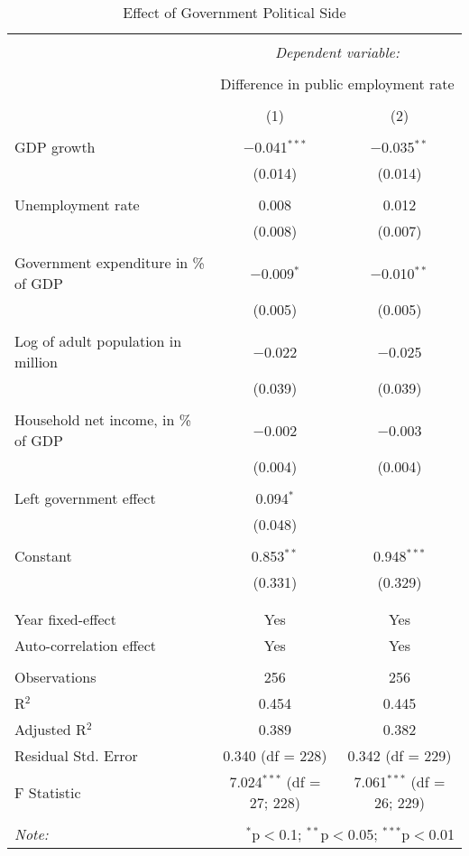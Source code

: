 
\begin{table}[!htbp] \centering 
  \caption{Effect of Government Political Side} 
  \label{} 
\begin{tabular}{@{\extracolsep{5pt}}lcc} 
\\[-1.8ex]\hline 
\hline \\[-1.8ex] 
 & \multicolumn{2}{c}{\textit{Dependent variable:}} \\ 
\cline{2-3} 
\\[-1.8ex] & \multicolumn{2}{c}{Difference in public employment rate} \\ 
\\[-1.8ex] & (1) & (2)\\ 
\hline \\[-1.8ex] 
 GDP growth & $-$0.041$^{***}$ & $-$0.035$^{**}$ \\ 
  & (0.014) & (0.014) \\ 
  & & \\ 
 Unemployment rate & 0.008 & 0.012 \\ 
  & (0.008) & (0.007) \\ 
  & & \\ 
 Government expenditure in \% of GDP & $-$0.009$^{*}$ & $-$0.010$^{**}$ \\ 
  & (0.005) & (0.005) \\ 
  & & \\ 
 Log of adult population in million & $-$0.022 & $-$0.025 \\ 
  & (0.039) & (0.039) \\ 
  & & \\ 
 Household net income, in \% of GDP & $-$0.002 & $-$0.003 \\ 
  & (0.004) & (0.004) \\ 
  & & \\ 
 Left government effect & 0.094$^{*}$ &  \\ 
  & (0.048) &  \\ 
  & & \\ 
 Constant & 0.853$^{**}$ & 0.948$^{***}$ \\ 
  & (0.331) & (0.329) \\ 
  & & \\ 
\hline \\[-1.8ex] 
Year fixed-effect & Yes & Yes \\ 
Auto-correlation effect & Yes & Yes \\ 
\hline \\[-1.8ex] 
Observations & 256 & 256 \\ 
R$^{2}$ & 0.454 & 0.445 \\ 
Adjusted R$^{2}$ & 0.389 & 0.382 \\ 
Residual Std. Error & 0.340 (df = 228) & 0.342 (df = 229) \\ 
F Statistic & 7.024$^{***}$ (df = 27; 228) & 7.061$^{***}$ (df = 26; 229) \\ 
\hline 
\hline \\[-1.8ex] 
\textit{Note:}  & \multicolumn{2}{r}{$^{*}$p$<$0.1; $^{**}$p$<$0.05; $^{***}$p$<$0.01} \\ 
\end{tabular} 
\end{table} 
